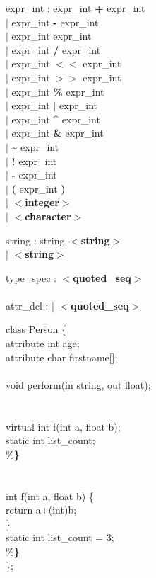 \begin{tabbing}
\grindent
expr\_int \> : expr\_int {\bf +} expr\_int\\
\> $|$ expr\_int {\bf -} expr\_int\\
\> $|$ expr\_int {\bf *} expr\_int\\
\> $|$ expr\_int {\bf /} expr\_int\\
\> $|$ expr\_int {\bf $<$$<$} expr\_int\\
\> $|$ expr\_int {\bf $>$$>$} expr\_int\\
\> $|$ expr\_int {\bf \%} expr\_int\\
\> $|$ expr\_int {\bf $|$} expr\_int\\
\> $|$ expr\_int {\bf \^{ }} expr\_int\\
\> $|$ expr\_int {\bf \&} expr\_int\\
\> $|$ {\bf \~{ }} expr\_int\\
\> $|$ {\bf !} expr\_int\\
\> $|$ {\bf -} expr\_int\\
\> $|$ {\bf (} expr\_int {\bf )}\\
\> $|$ {\bf $<$integer$>$}\\
\> $|$ {\bf $<$character$>$}
\end{tabbing}

\begin{tabbing}
\grindent
string \> : string {\bf $<$string$>$}\\
\> $|$ {\bf $<$string$>$}
\end{tabbing}

\begin{tabbing}
\grindent
type\_spec \> : {\bf $<$quoted\_seq$>$}\\
\\
attr\_dcl \> : $|$ {\bf $<$quoted\_seq$>$}
\end{tabbing}
\begin{tabbing}
cla\=ss \= Per\=son \{\\
\>attribute int age;\\
\>attribute char firstname[];\\
\\
\>void perform(in string, out float);\\
\\
\\
\>\>virtual int f(int a, float b);\\
\>\>static int list\_count;\\
\>\%{\bf \}}\\
\\
\\
\>\>int f(int a, float b) \{\\
\>\>\>return a+(int)b;\\
\>\>\}\\
\>\>static int list\_count = 3;\\
\>\%{\bf \}}\\
\};
\end{tabbing}

